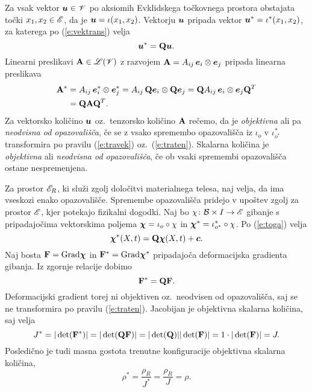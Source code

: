 Za vsak vektor $\boldsymbol u\in\mathscr V$ po aksiomih Evklidskega točkovnega prostora obstajata
točki $x_1,x_2\in\mathscr E$, da je $\boldsymbol u=\iota(x_1,x_2)$. Vektorju $\boldsymbol u$ pripada
vektor $\boldsymbol u^*=\iota^*(x_1,x_2)$, za katerega po (\ref{e:vektrans}) velja
\begin{equation} \label{e:travek}
	\boldsymbol u^*=\mathbf Q\boldsymbol u.
\end{equation}
Linearni preslikavi $\mathbf A\in\mathscr L(\mathscr V)$ z razvojem $\mathbf A=A_{ij}\,\boldsymbol e_i\otimes\boldsymbol e_j$
pripada linearna preslikava
\begin{align}
	\mathbf A^*&=A_{ij}\,\boldsymbol e^*_i\otimes\boldsymbol e^*_j=A_{ij}\,\mathbf Q\boldsymbol e_i\otimes\mathbf Q\boldsymbol e_j
	=\mathbf QA_{ij}\,\boldsymbol e_i\otimes\boldsymbol e_j\mathbf Q^T \nonumber \\
	&=\mathbf Q\mathbf A\mathbf Q^T. \label{e:traten}
\end{align}
Za vektorsko količino $\boldsymbol u$ oz.~tenzorsko količino $\mathbf A$
rečemo, da je \emph{objektivna} ali pa \emph{neodvisna od opazovališča},
če se z vsako spremembo opazovališča iz $\iota_o$ v $\iota^*_{o^*}$
transformira po pravilu (\ref{e:travek}) oz.~(\ref{e:traten}).
Skalarna količina je \emph{objektivna} ali \emph{neodvisna od opazovališča},
če ob vsaki spremembi opazovališča ostane nespremenjena.

Za prostor $\mathscr E_R$, ki služi zgolj določitvi materialnega telesa, naj velja,
da ima vseskozi enako opazovališče. Spremembe opazovališča pridejo v upoštev zgolj
za prostor $\mathscr E$, kjer potekajo fizikalni dogodki. Naj bo $\chi\colon\mathcal B\times I\to\mathscr E$
gibanje s pripadajočima vektorskima poljema $\boldsymbol \chi=\iota_o\circ\chi$ in
$\boldsymbol \chi^*=\iota^*_{o^*}\circ\chi$. Po (\ref{e:toga}) velja
\[
	\boldsymbol \chi^*(X,t)=\mathbf Q\boldsymbol \chi(X,t)+\boldsymbol c.
\]
Naj bosta $\mathbf F=\mathrm{Grad}\boldsymbol \chi$ in $\mathbf F^*=\mathrm{Grad}\boldsymbol \chi^*$ pripadajoča
deformacijska gradienta gibanja. Iz zgornje relacije dobimo
\[
	\mathbf F^*=\mathbf Q\mathbf F.
\]
Deformacijski gradient torej ni objektiven oz.~neodvisen od opazovališča, saj se ne
transformira po pravilu (\ref{e:traten}). Jacobijan je objektivna skalarna
količina, saj velja
\[
	J^*=|\det(\mathbf F^*)|=|\det(\mathbf Q\mathbf F)|=|\det(\mathbf Q)||\det(\mathbf F)|
	=1\cdot|\det(\mathbf F)|=J.
\]
Posledično je tudi masna gostota trenutne konfiguracije objektivna skalarna količina,
\[ \rho^*=\frac{\rho_R}{J^*}=\frac{\rho_R}{J}=\rho. \]

